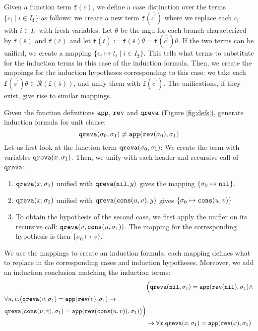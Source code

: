 Given a function term $\mathtt{f}(\overline{c})$, we define a case distinction over the terms $\{c_i\mid i\in I_\mathtt{f}\}$ as follows: we create a new term $\mathtt{f}(\overline{c^\prime})$ where we replace each $c_i$ with $i\in I_\mathtt{f}$ with fresh variables. Let $\theta$ be the mgu for each branch characterized by $\mathtt{f}(\overline{s})$ and $\mathtt{f}(\overline{c})$ and let $\mathtt{f}(\overline{t}):=\mathtt{f}(\overline{s})\theta=\mathtt{f}(\overline{c^\prime})\theta$. If the two terms can be unified, we create a mapping $\{c_i\mapsto t_i\mid i\in I_\mathtt{f}\}$. This tells what terms to substitute for the induction terms in this case of the induction formula. Then, we create the mappings for the induction hypotheses corresponding to this case: we take each $\mathtt{f}(\overline{s^\prime})\theta\in\mathcal{R}(\mathtt{f}(\overline{s}))$, and unify them with $\mathtt{f}(\overline{c^\prime})$. The unifications, if they exist, give rise to similar mappings.

\begin{example}\label{ex:3}
	Given the function definitions $\mathtt{app}$, $\mathtt{rev}$ and $\mathtt{qreva}$ (Figure \ref{fig:defs}), generate induction formula for unit clause:
	$$\mathtt{qreva}(\sigma_0,\sigma_1)\neq\mathtt{app}(\mathtt{rev}(\sigma_0),\sigma_1)$$
	Let us first look at the function term $\mathtt{qreva}(\sigma_0,\sigma_1)$:
	We create the term with variables $\mathtt{qreva}(x,\sigma_1)$. Then, we unify with each
	header and recursive call of $\mathtt{qreva}$:
	\begin{enumerate}
		\item $\mathtt{qreva}(x,\sigma_1)$ unified with $\mathtt{qreva}(\mathtt{nil},y)$ gives the mapping $\{\sigma_0\mapsto\mathtt{nil}\}$.
		\item $\mathtt{qreva}(x,\sigma_1)$ unified with $\mathtt{qreva}(\mathtt{cons}(u,v),y)$ gives $\{\sigma_0\mapsto\mathtt{cons}(u,v)\}$
		\item To obtain the hypothesis of the second case, we first apply the unifier on its recursive call: $\mathtt{qreva}(v, \mathtt{cons}(u,\sigma_1))$. The mapping for the corresponding hypothesis is then $\{\sigma_0\mapsto v\}$.
	\end{enumerate}
	We use the mappings to create an induction formula: each mapping defines what to replace in the corresponding cases and induction hypotheses. Moreover, we add an induction conclusion matching the induction terms:
	\begin{align}
    \nonumber	&\Big(\mathtt{qreva}(\mathtt{nil},\sigma_1)=\mathtt{app}(\mathtt{rev}(\mathtt{nil}),\sigma_1)\land\\
	\begin{split}\nonumber&\forall u,v.\big(\mathtt{qreva}(v,\sigma_1)=\mathtt{app}(\mathtt{rev}(v),\sigma_1)\rightarrow\\
	&\mathtt{qreva}(\mathtt{cons}(u,v),\sigma_1)=\mathtt{app}(\mathtt{rev}(\mathtt{cons}(u,v)),\sigma_1)\big)\Big)\end{split}\\
    \nonumber&\rightarrow \forall x.\mathtt{qreva}(x,\sigma_1)=\mathtt{app}(\mathtt{rev}(x),\sigma_1)
	\end{align}
\end{example}


